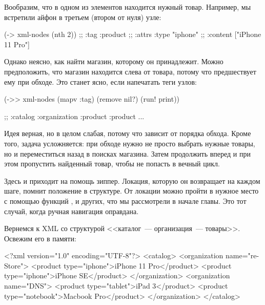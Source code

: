 Вообразим, что в одном из элементов находится нужный товар. Например, мы
встретили айфон в третьем (втором от нуля) узле:

\begin{english}
  \begin{clojure}
(-> xml-nodes (nth 2))
;; {:tag :product
;;  :attrs {:type "iphone"}
;;  :content ["iPhone 11 Pro"]}
  \end{clojure}
\end{english}

Однако неясно, как найти магазин, которому он принадлежит. Можно предположить,
что магазин находится слева от товара, потому что предшествует ему при
обходе. Это станет ясно, если напечатать теги узлов:

\begin{english}
  \begin{clojure}
(->> xml-nodes
     (mapv :tag)
     (remove nil?)
     (run! print))

;; :catalog :organization :product :product ...
  \end{clojure}
\end{english}

Идея верная, но в целом слабая, потому что зависит от порядка обхода. Кроме
того, задача усложняется: при обходе нужно не просто выбрать нужные товары, но и
переместиться назад в поисках магазина. Затем продолжить вперед и при этом
пропустить найденный товар, чтобы не попасть в вечный цикл.

Здесь и приходит на помощь зиппер. Локация, которую он возвращает на каждом
шаге, помнит положение в структуре. От локации можно пройти в нужное место с
помощью функций ,  и других, что мы рассмотрели в
начале главы. Это тот случай, когда ручная навигация оправдана.


Вернемся к XML со структурой <<каталог~--- организация~--- товары>>. Освежим его в
памяти:

\begin{english}
  \begin{xml}
<?xml version="1.0" encoding="UTF-8"?>
<catalog>
  <organization name="re-Store">
    <product type="iphone">iPhone 11 Pro</product>
    <product type="iphone">iPhone SE</product>
  </organization>
  <organization name="DNS">
    <product type="tablet">iPad 3</product>
    <product type="notebook">Macbook Pro</product>
  </organization>
</catalog>
  \end{xml}
\end{english}

